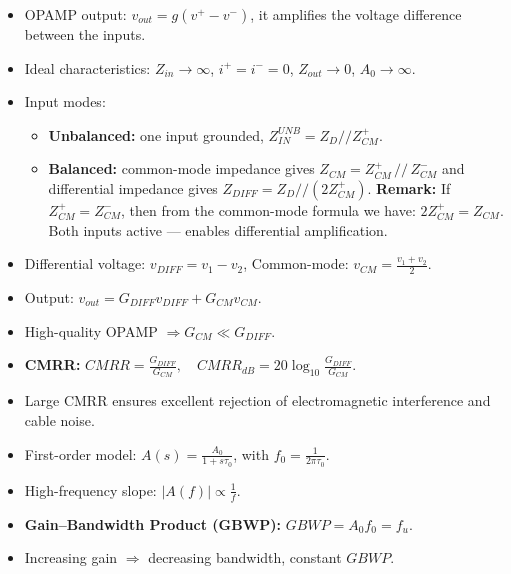 \begin{tcolorbox}[colback=gray!10,colframe=black,title=Summary: Operational Amplifier Fundamentals]
\begin{itemize}
\item OPAMP output: $v_{out} = g(v^+ - v^-)$, it amplifies the voltage difference between the inputs.
\item Ideal characteristics: $Z_{in} \to \infty$, $i^+ = i^- = 0$, $Z_{out} \to 0$, $A_0 \to \infty$.
\item Input modes:
\begin{itemize}
\item \textbf{Unbalanced:} one input grounded, $Z_{IN}^{UNB} = Z_D // Z_{CM}^+$.
\item \textbf{Balanced:} common-mode impedance gives $Z_{CM} = Z_{CM}^+ \, // \, Z_{CM}^-
        $ and differential impedance gives $Z_{DIFF} = Z_D // (2 Z_{CM}^+)$.
        \textbf{Remark:}  
If $Z_{CM}^+ = Z_{CM}^-$, then from the common-mode formula we have: $2 Z_{CM}^+ = Z_{CM} $. Both inputs active — enables differential amplification.
\end{itemize}
\end{itemize}
\end{tcolorbox}

\begin{tcolorbox}[colback=gray!10,colframe=black,title=Summary: Differential & Common-Mode Behavior]
\begin{itemize}
\item Differential voltage: $v_{DIFF} = v_1 - v_2$, \quad Common-mode: $v_{CM} = \tfrac{v_1 + v_2}{2}$.
\item Output: $v_{out} = G_{DIFF}v_{DIFF} + G_{CM}v_{CM}$.
\item High-quality OPAMP $\Rightarrow G_{CM} \ll G_{DIFF}$.
\item \textbf{CMRR:} $\displaystyle CMRR = \frac{G_{DIFF}}{G_{CM}},\quad CMRR_{dB} = 20\log_{10}\frac{G_{DIFF}}{G_{CM}}.$
\item Large CMRR ensures excellent rejection of electromagnetic interference and cable noise.
\end{itemize}
\end{tcolorbox}

\begin{tcolorbox}[colback=gray!10,colframe=black,title=Summary: Frequency Response & Bandwidth]
\begin{itemize}
\item First-order model: $\displaystyle A(s) = \frac{A_0}{1 + s\tau_0}$, with $f_0 = \frac{1}{2\pi\tau_0}$.
\item High-frequency slope: $|A(f)| \propto \frac{1}{f}$.
\item \textbf{Gain–Bandwidth Product (GBWP):} $GBWP = A_0 f_0 = f_u$.
\item Increasing gain $\Rightarrow$ decreasing bandwidth, constant $GBWP$.
\end{itemize}
\end{tcolorbox}

